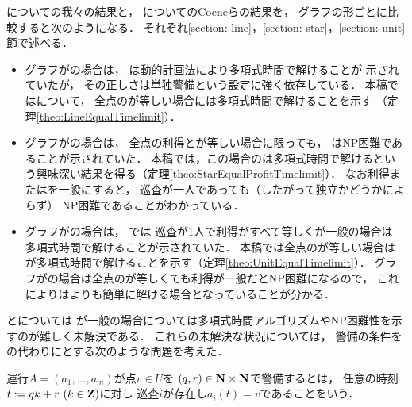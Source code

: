 {\patProb}についての我々の結果と，
{\independentPatProb}についてのCoeneらの結果を，
グラフの形ごとに比較すると次のようになる．
それぞれ\ref{section: line}，\ref{section: star}，\ref{section: unit}節で述べる．
\begin{itemize}
\item 
  グラフが{\graphLine}の場合は，
  {\independentPatProb}は動的計画法により多項式時間で解けることが
  示されていた\cite[Theorem~11]{coene2011charlemagne}が，
  その正しさは単独警備という設定に強く依存している．
  本稿では{\patProb}について，
  全点の{\maxIdletime}が等しい場合には多項式時間で解けることを示す
  （定理\ref{theo:LineEqualTimelimit}）．
\item
  グラフが{\graphStar}の場合は，
  全点の利得と{\maxIdletime}が等しい場合に限っても，
  {\independentPatProb}はNP困難であることが示されていた\cite[Theorem~10]{coene2011charlemagne}．
  本稿では，この場合の{\patProb}は多項式時間で解けるという興味深い結果を得る（定理\ref{theo:StarEqualProfitTimelimit}）．
  なお利得または{\maxIdletime}を一般にすると，
  巡査が一人であっても（したがって独立かどうかによらず）
  NP困難であることがわかっている\cite[Theorems 5 and 6]{coene2011charlemagne}．
\item 
  グラフが{\graphUnit}の場合は，
  {\independentPatProb}では
  巡査が1人で利得がすべて等しく{\maxIdletime}が一般の場合は
  多項式時間で解けることが示されていた\cite[Theorem~7]{coene2011charlemagne}．
  本稿では全点の{\maxIdletime}が等しい場合は{\patProb}が多項式時間で解けることを示す（定理\ref{theo:UnitEqualTimelimit}）．
  グラフが{\graphStar}の場合は全点の{\maxIdletime}が等しくても利得が一般だとNP困難になるので，
  これにより{\graphUnit}は{\graphStar}よりも簡単に解ける場合となっていることが分かる．
\end{itemize}


{\graphLine}と{\graphUnit}については
{\maxIdletime}が一般の場合については多項式時間アルゴリズムやNP困難性を示すのが難しく未解決である．
これらの未解決な状況については，
警備の条件を{\maxIdletime}の代わりに{\exactIdletime}とする次のような問題を考えた．

\begin{defi}
運行$A = (a _1, \ldots, a _m)$が点$v \in U$を
{\exactIdletime}$(q, r) \in \mathbf N \times \mathbf N$で警備するとは，
任意の時刻$t := q k + r\ (k \in \mathbf Z)$に対し
巡査$i$が存在し$a _i (t) = v$であることをいう．
\end{defi}

